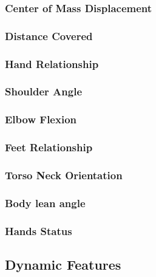 \documentclass{article}
\begin{document}
\subsubsection{Center of Mass Displacement}

\subsubsection{Distance Covered}

\subsubsection{Hand Relationship}

\subsubsection{Shoulder Angle}

\subsubsection{Elbow Flexion}

\subsubsection{Feet Relationship}

\subsubsection{Torso Neck Orientation}

\subsubsection{Body lean angle}

\subsubsection{Hands Status}

\subsection{Dynamic Features}
\end{document}

